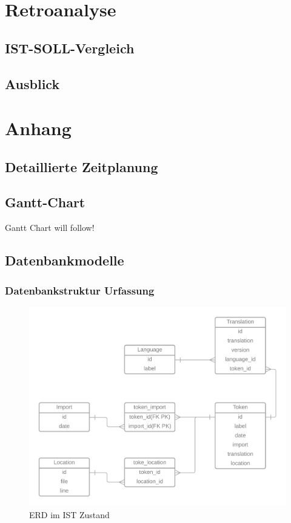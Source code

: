 \documentclass[10pt, oneside]{article}
\begin{document}
  \section{Retroanalyse}
  \subsection{IST-SOLL-Vergleich}
  \subsection{Ausblick}
  \setcounter{section}{0}
  \renewcommand{\thesection}{\MakeUppercase{\alph{section}}}
  \section{Anhang}
  \subsection{Detaillierte Zeitplanung}\label{sec:detailTime}
  \subsection{Gantt-Chart}\label{sec:GanttChart}
    Gantt Chart will follow!
    \newpage
  \subsection{Datenbankmodelle}
  \subsubsection{Datenbankstruktur Urfassung}\label{sec:erd:is}
  \begin{figure}[ht]
    \label{abb:erdIs1}
    \centering
    \includegraphics[width=\textwidth]{ERD_TranslationService_IST-Analyse.png}
    \caption{ERD im IST Zustand}
  \end{figure}
\end{document}
